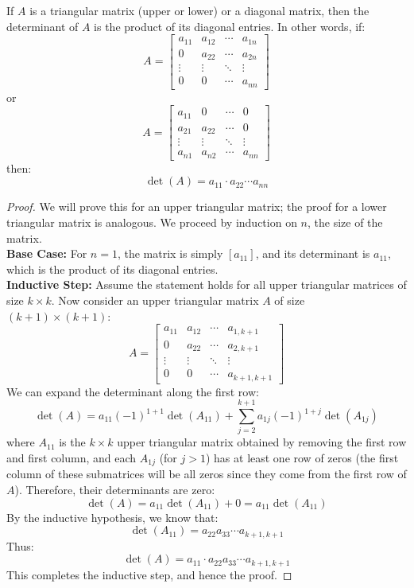 \begin{theorem}
    If $A$ is a triangular matrix (upper or lower) or a diagonal matrix, then the determinant of $A$ is the product of its diagonal entries. In other words, if:
    \[
        A = \begin{bmatrix}
            a_{11} & a_{12} & \cdots & a_{1n} \\
            0 & a_{22} & \cdots & a_{2n} \\
            \vdots & \vdots & \ddots & \vdots \\
            0 & 0 & \cdots & a_{nn}
        \end{bmatrix}
    \]
    or
    \[
        A = \begin{bmatrix}
            a_{11} & 0 & \cdots & 0 \\
            a_{21} & a_{22} & \cdots & 0 \\
            \vdots & \vdots & \ddots & \vdots \\
            a_{n1} & a_{n2} & \cdots & a_{nn}
        \end{bmatrix}
    \]
    then:
    \[
        \det(A) = a_{11} \cdot a_{22} \cdots a_{nn}
    \]
\end{theorem}
\begin{proof}
    We will prove this for an upper triangular matrix; the proof for a lower triangular matrix is analogous. We proceed by induction on \(n\), the size of the matrix. \\
    \textbf{Base Case:} For \(n = 1\), the matrix is simply \([a_{11}]\), and its determinant is \(a_{11}\), which is the product of its diagonal entries. \\
    \textbf{Inductive Step:} Assume the statement holds for all upper triangular matrices of size \(k \times k\). Now consider an upper triangular matrix \(A\) of size \((k+1) \times (k+1)\):
    \[
        A = \begin{bmatrix}
            a_{11} & a_{12} & \cdots & a_{1,k+1} \\
            0 & a_{22} & \cdots & a_{2,k+1} \\
            \vdots & \vdots & \ddots & \vdots \\
            0 & 0 & \cdots & a_{k+1,k+1}
        \end{bmatrix}
    \]
    We can expand the determinant along the first row:
    \[
        \det(A) = a_{11} (-1)^{1+1} \det(A_{11}) + \sum_{j=2}^{k+1} a_{1j} (-1)^{1+j} \det(A_{1j})
    \]
    where \(A_{11}\) is the \(k \times k\) upper triangular matrix obtained by removing the first row and first column, and each \(A_{1j}\) (for \(j > 1\)) has at least one row of zeros (the first column of these submatrices will be all zeros since they come from the first row of \(A\)). Therefore, their determinants are zero:
    \[
        \det(A) = a_{11} \det(A_{11}) + 0 = a_{11} \det(A_{11})
    \]
    By the inductive hypothesis, we know that:
    \[
        \det(A_{11}) = a_{22} a_{33} \cdots a_{k+1,k+1}
    \]
    Thus:
    \[
        \det(A) = a_{11} \cdot a_{22} a_{33} \cdots a_{k+1,k+1}
    \]
    This completes the inductive step, and hence the proof.
\end{proof}